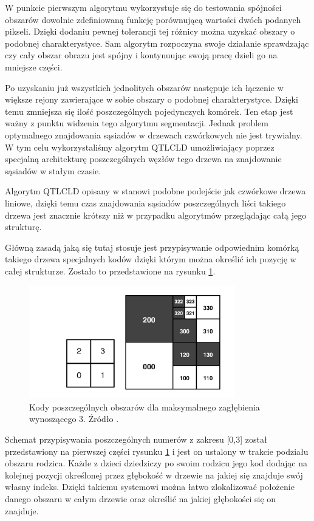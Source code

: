 \documentclass{classrep}
\begin{document}
W punkcie pierwszym algorytmu wykorzystuje się do testowania spójności obszarów dowolnie zdefiniowaną funkcję porównującą wartości dwóch podanych pikseli. Dzięki dodaniu pewnej tolerancji tej różnicy można uzyskać obszary o podobnej charakterystyce. Sam algorytm rozpoczyna swoje działanie sprawdzając czy cały obszar obrazu jest spójny i kontynuując swoją pracę dzieli go na mniejsze części.

Po uzyskaniu już wszystkich jednolitych obszarów następuje ich łączenie w większe rejony zawierające w sobie obszary o podobnej charakterystyce. Dzięki temu zmniejsza się ilość poszczególnych pojedynczych komórek. Ten etap jest ważny z punktu widzenia tego algorytmu segmentacji. Jednak problem optymalnego znajdowania sąsiadów w drzewach czwórkowych nie jest trywialny. W tym celu wykorzystaliśmy algorytm QTLCLD \cite{3} umożliwiający poprzez specjalną architekturę poszczególnych węzłów tego drzewa na znajdowanie sąsiadów w stałym czasie.

Algorytm QTLCLD opisany w \cite{3} stanowi podobne podejście jak czwórkowe drzewa liniowe, dzięki temu czas znajdowania sąsiadów poszczególnych liści takiego drzewa jest znacznie krótszy niż w przypadku algorytmów przeglądając całą jego strukturę. 

Główną zasadą jaką się tutaj stosuje jest przypisywanie odpowiednim komórką takiego drzewa specjalnych kodów dzięki którym można określić ich pozycję w całej strukturze. Zostało to przedstawione na rysunku \ref{fig_seg_kody}.

\begin{figure}[H]
  \centering
  \includegraphics[width=0.8\textwidth]{img/seg/kody}
  \caption{Kody poszczególnych obszarów dla maksymalnego zagłębienia wynoszącego 3. Źródło \cite{3}.}
  \label{fig_seg_kody}
\end{figure}

Schemat przypisywania poszczególnych numerów z zakresu [0,3] został przedstawiony na pierwszej części rysunku \ref{fig_seg_kody} i jest on ustalony w trakcie podziału obszaru rodzica. Każde z dzieci dziedziczy po swoim rodzicu jego kod dodając na kolejnej pozycji określonej przez głębokość w drzewie na jakiej się znajduje swój własny indeks. Dzięki takiemu systemowi można łatwo zlokalizować położenie danego obszaru w całym drzewie oraz określić na jakiej głębokości się on znajduje. 
\end{document}
